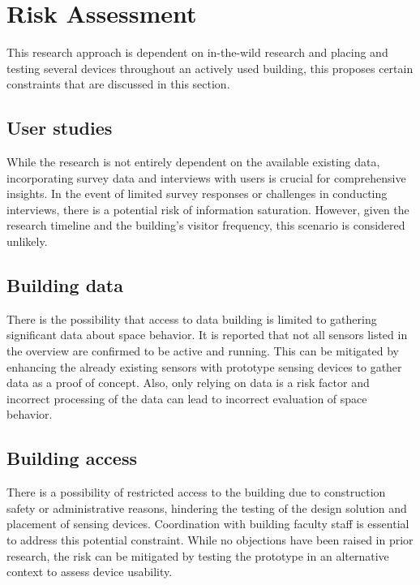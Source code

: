 \section{Risk Assessment}

This research approach is dependent on in-the-wild research and placing and testing several devices throughout an actively used building, this proposes certain constraints that are discussed in this section.

\subsection{User studies}

While the research is not entirely dependent on the available existing data, incorporating survey data and interviews with users is crucial for comprehensive insights. In the event of limited survey responses or challenges in conducting interviews, there is a potential risk of information saturation. However, given the research timeline and the building's visitor frequency, this scenario is considered unlikely.

\subsection{Building data}

There is the possibility that access to data building is limited to gathering significant data about space behavior. It is reported that not all sensors listed in the overview are confirmed to be active and running. This can be mitigated by enhancing the already existing sensors with prototype sensing devices to gather data as a proof of concept. Also, only relying on data is a risk factor and incorrect processing of the data can lead to incorrect evaluation of space behavior.

\subsection{Building access}

There is a possibility of restricted access to the building due to construction safety or administrative reasons, hindering the testing of the design solution and placement of sensing devices. Coordination with building faculty staff is essential to address this potential constraint. While no objections have been raised in prior research, the risk can be mitigated by testing the prototype in an alternative context to assess device usability.

